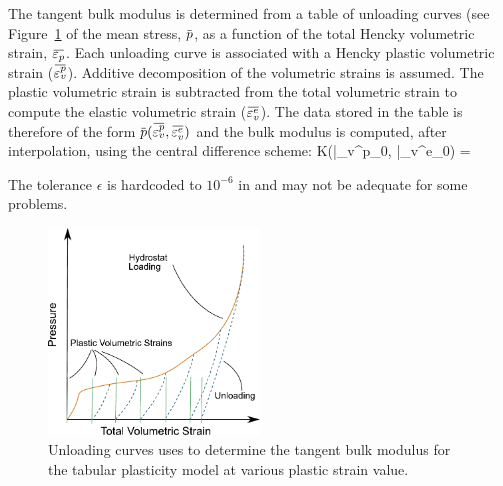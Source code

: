 The tangent bulk modulus is determined from a table of unloading curves (see 
Figure~\ref{fig:tabular_unload_curves} of the mean stress, $\pbar$, as a function
of the total Hencky volumetric strain, $\bar{\Veps_p}$.  Each unloading 
curve is associated with a Hencky plastic volumetric strain ($\bar{\Veps_v^p}$).
Additive decomposition of the volumetric strains is assumed.  The plastic volumetric 
strain is subtracted from the total volumetric strain to compute the elastic
volumetric strain ($\bar{\Veps_v^e}$).  The data stored in the table is therefore
of the form $\pbar(\bar{\Veps_v^p},\bar{\Veps_v^e})$ and the bulk modulus is computed,
after interpolation, using the central difference scheme:
\Beq
  K(\bar{\Veps_v^p}_0, \bar{\Veps_v^e}_0) = 
\Eeq
\begin{WarningBox}
The tolerance $\epsilon$ is hardcoded to $10^{-6}$ in \Vaango and
may not be adequate for some problems.
\end{WarningBox}
\begin{figure}[htbp!]
  \centering
  \includegraphics[width=0.5\textwidth]{Figs/tabular/TabularHydrostat.pdf}
  \caption{Unloading curves uses to determine the tangent bulk modulus for the
           tabular plasticity model at various plastic strain value.}
  \label{fig:tabular_unload_curves}
\end{figure}

